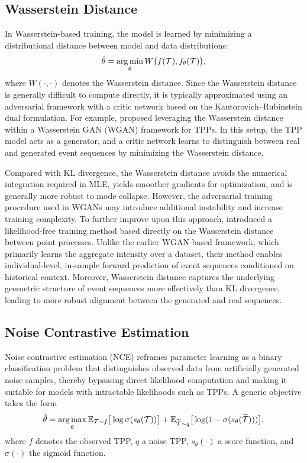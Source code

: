 \documentclass[10pt]{article} %
\begin{document}
\subsection{Wasserstein Distance}
\label{wasserstein}

In Wasserstein-based training, the model is learned by minimizing a distributional distance between model and data distributions: 
\begin{equation}
    \hat{\theta} = \operatorname*{arg\,min}_\theta W\big(f(\mathcal{T}), f_\theta(\mathcal{T})\big),
\end{equation}
where $W(\cdot,\cdot)$ denotes the Wasserstein distance. 
Since the Wasserstein distance is generally difficult to compute directly, it is typically approximated using an adversarial framework with a critic network based on the Kantorovich–Rubinstein dual formulation. 
For example, \citet{xiao2017wasserstein} proposed leveraging the Wasserstein distance within a Wasserstein GAN (WGAN) framework for TPPs. In this setup, the TPP model acts as a generator, and a critic network learns to distinguish between real and generated event sequences by minimizing the Wasserstein distance. 

Compared with KL divergence, the Wasserstein distance avoids the numerical integration required in MLE, yields smoother gradients for optimization, and is generally more robust to mode collapse. However, the adversarial training procedure used in WGANs may introduce additional instability and increase training complexity. 
To further improve upon this approach, \citet{xiao2018learning} introduced a likelihood-free training method based directly on the Wasserstein distance between point processes. Unlike the earlier WGAN-based framework, which primarily learns the aggregate intensity over a dataset, their method enables individual-level, in-sample forward prediction of event sequences conditioned on historical context. Moreover, Wasserstein distance captures the underlying geometric structure of event sequences more effectively than KL divergence, leading to more robust alignment between the generated and real sequences. 


\subsection{Noise Contrastive Estimation}
\label{noise_constrastive}
Noise contrastive estimation (NCE) reframes parameter learning as a binary classification problem that distinguishes observed data from artificially generated noise samples, thereby bypassing direct likelihood computation and making it suitable for models with intractable likelihoods such as TPPs. A generic objective takes the form
\begin{equation}
\hat{\theta} = \operatorname*{arg\,max}_\theta \mathbb{E}_{\mathcal{T}\sim f}\big[\log \sigma(s_\theta(\mathcal{T}))\big] +
\mathbb{E}_{\widetilde{\mathcal{T}}\sim q}\big[\log (1-\sigma(s_\theta(\widetilde{\mathcal{T}})))\big],
\end{equation}
where $f$ denotes the observed TPP, $q$ a noise TPP, $s_\theta(\cdot)$ a score function, and $\sigma(\cdot)$ the sigmoid function. 
\end{document}
